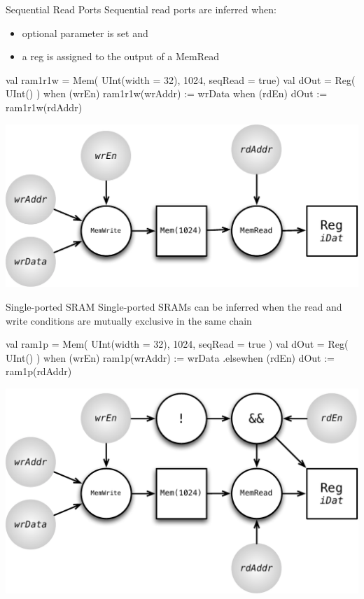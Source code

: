 \documentclass[xcolor=pdflatex,dvipsnames,table]{beamer}
\begin{document}
\begin{frame}[fragile]{Sequential Read Ports}
Sequential read ports are inferred when:
\begin{itemize}
\item optional parameter  is set and
\item a reg is assigned to the output of a MemRead
\end{itemize}

\begin{scala}
val ram1r1w = Mem( UInt(width = 32), 1024, seqRead = true)
val dOut    = Reg( UInt() )
when (wrEn) { ram1r1w(wrAddr) := wrData }
when (rdEn) { dOut := ram1r1w(rdAddr) }
\end{scala}

\begin{center}
\includegraphics[height=0.4\textheight]{figs/mem-seq-read.pdf} 
\end{center}

\end{frame}

\begin{frame}[fragile]{Single-ported SRAM}
Single-ported SRAMs can be inferred when the read and write conditions are
mutually exclusive in the same  chain

\begin{scala}
val ram1p = Mem( UInt(width = 32), 1024, seqRead = true )
val dOut  = Reg( UInt() )
when (wrEn) { ram1p(wrAddr) := wrData }
.elsewhen (rdEn) { dOut := ram1p(rdAddr) }
\end{scala}

\begin{center}
\includegraphics[height=0.5\textheight]{figs/mem-single-ported.pdf} 
\end{center}

\end{frame}
\end{document}
